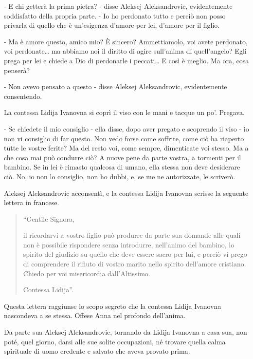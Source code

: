 - E chi getterà la prima pietra? - disse Aleksej Aleksandrovic, evidentemente soddisfatto della propria parte. - Io ho perdonato tutto e perciò non posso privarla di quello che è un'esigenza d'amore per lei, d'amore per il figlio. 

- Ma è amore questo, amico mio? È sincero? Ammettiamolo, voi avete perdonato, voi perdonate\ldots{} ma abbiamo noi il diritto di agire sull'anima di quell'angelo? Egli prega per lei e chiede a Dio di perdonarle i peccati\ldots{} E così è meglio. Ma ora, cosa penserà? 

- Non avevo pensato a questo - disse Aleksej Aleksandrovic, evidentemente consentendo. 

La contessa Lidija Ivanovna si coprì il viso con le mani e tacque un po'. Pregava. 

- Se chiedete il mio consiglio - ella disse, dopo aver pregato e scoprendo il viso - io non vi consiglio di far questo. Non vedo forse come soffrite, come ciò ha riaperto tutte le vostre ferite? Ma del resto voi, come sempre, dimenticate voi stesso. Ma a che cosa mai può condurre ciò? A nuove pene da parte vostra, a tormenti per il bambino. Se in lei è rimasto qualcosa di umano, ella stessa non deve desiderare ciò. No, io non lo consiglio, non ho dubbi, e, se me ne autorizzate, le scriverò. 

Aleksej Aleksandrovic acconsentì, e la contessa Lidija Ivanovna scrisse la seguente lettera in francese. 

\begin{quote}
``Gentile Signora,

il ricordarvi a vostro figlio può produrre da parte sua domande alle quali non è possibile rispondere senza introdurre, nell'animo del bambino, lo spirito del giudizio su quello che deve essere sacro per lui, e perciò vi prego di comprendere il rifiuto di vostro marito nello spirito dell'amore cristiano. Chiedo per voi misericordia dall'Altissimo.

Contessa Lidija''.
\end{quote} 

Questa lettera raggiunse lo scopo segreto che la contessa Lidija Ivanovna nascondeva a se stessa. Offese Anna nel profondo dell'anima. 

Da parte sua Aleksej Aleksandrovic, tornando da Lidija Ivanovna a casa sua, non poté, quel giorno, darsi alle sue solite occupazioni, né trovare quella calma spirituale di uomo credente e salvato che aveva provato prima. 

